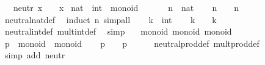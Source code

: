 \begin{isabellebody}
\ \ \ neutr{\isacharcolon}\ {\isachardoublequoteopen}x\ {\isasymotimes}\ {\isasymone}\ {\isacharequal}\ x{\isachardoublequoteclose}\isanewline
\isanewline
{}\isamarkupfalse%
\ nat\ \ int\ {\isacharcolon}{\isacharcolon}\ monoid\ \isanewline
{}\isanewline
\isanewline
{}\isamarkupfalse%
\ \isamarkupfalse%
\isanewline
\ \ \isamarkupfalse%
\ n\ {\isacharcolon}{\isacharcolon}\ nat\isanewline
\ \ \isamarkupfalse%
\ {\isachardoublequoteopen}n\ {\isasymotimes}\ {\isasymone}\ {\isacharequal}\ n{\isachardoublequoteclose}\isanewline
\ \ \ \ \isamarkupfalse%
\ neutral{\isacharunderscore}nat{\isacharunderscore}def\ \isamarkupfalse%
\ {\isacharparenleft}induct\ n{\isacharparenright}\ simp{\isacharunderscore}all\isanewline
{}\isamarkupfalse%
\isanewline
\ \ \isamarkupfalse%
\ k\ {\isacharcolon}{\isacharcolon}\ int\isanewline
\ \ \isamarkupfalse%
\ {\isachardoublequoteopen}k\ {\isasymotimes}\ {\isasymone}\ {\isacharequal}\ k{\isachardoublequoteclose}\isanewline
\ \ \ \ \isamarkupfalse%
\ neutral{\isacharunderscore}int{\isacharunderscore}def\ mult{\isacharunderscore}int{\isacharunderscore}def\ \isamarkupfalse%
\ simp\isanewline
{}\isamarkupfalse%
\isanewline
\isanewline
{}\isamarkupfalse%
\isanewline
\isanewline
{}\isamarkupfalse%
\ {\isacharasterisk}\ {\isacharcolon}{\isacharcolon}\ {\isacharparenleft}monoid{\isacharcomma}\ monoid{\isacharparenright}\ monoid\isanewline
{}\isanewline
\isanewline
{}\isamarkupfalse%
\ \isamarkupfalse%
\ \isanewline
\ \ \isamarkupfalse%
\ p\ {\isacharcolon}{\isacharcolon}\ {\isachardoublequoteopen}{\isasymalpha}{\isasymColon}monoid\ {\isasymtimes}\ {\isasymbeta}{\isasymColon}monoid{\isachardoublequoteclose}\isanewline
\ \ \isamarkupfalse%
\ {\isachardoublequoteopen}p\ {\isasymotimes}\ {\isasymone}\ {\isacharequal}\ p{\isachardoublequoteclose}\isanewline
\ \ \ \ \isamarkupfalse%
\ neutral{\isacharunderscore}prod{\isacharunderscore}def\ mult{\isacharunderscore}prod{\isacharunderscore}def\ \isamarkupfalse%
\ {\isacharparenleft}simp\ add{\isacharcolon}\ neutr{\isacharparenright}\isanewline
{}\isamarkupfalse%
\isanewline
\isanewline
{}\isamarkupfalse%
%
\endisatagquote
{\isafoldquote}%

\end{isabellebody}
